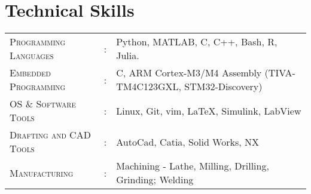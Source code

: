 \documentclass[letterpaper,10pt]{article}
\begin{document}
\section{Technical Skills}
\begin{tabular}{l c l}
	\textsc{Programming Languages}&:& Python, MATLAB, C, C++, Bash, R, Julia.\\
    \textsc{Embedded Programming}&:& C, ARM Cortex-M3/M4 Assembly (TIVA-TM4C123GXL, STM32-Discovery)\\
	\textsc{OS \& Software Tools}&:& Linux, Git, vim, \LaTeX, Simulink, LabView\\
    \textsc{Drafting and CAD Tools}&:& AutoCad, Catia, Solid Works, NX\\
	\textsc{Manufacturing}&:& Machining - Lathe, Milling, Drilling, Grinding;
	Welding\\
\end{tabular}
\end{document}
